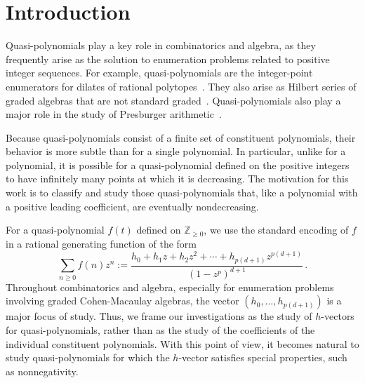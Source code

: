 \documentclass[12pt]{amsart}
\theoremstyle{definition}
\numberwithin{equation}{section}
\renewcommand\>{\rangle}
\newcommand\<{\langle}
\newcommand\0{\mathbf{0}}
\newcommand\ZZ{\mathbb{Z}}
\begin{document}


\section{Introduction}%
\label{sec:intro}%

Quasi-polynomials play a key role in combinatorics and algebra, as they frequently arise as the solution to enumeration problems related to positive integer sequences.
For example, quasi-polynomials are the integer-point enumerators for dilates of rational polytopes~\cite{ccd}.
They also arise as Hilbert series of graded algebras that are not standard graded~\cite{brunsherzog,numerical}.
Quasi-polynomials also play a major role in the study of Presburger arithmetic~\cite{presburgerarith,woodsunreasonable}.

Because quasi-polynomials consist of a finite set of constituent polynomials, their behavior is more subtle than for a single polynomial.
In particular, unlike for a polynomial, it is possible for a quasi-polynomial defined on the positive integers to have infinitely many points at which it is decreasing.	
The motivation for this work is to classify and study those quasi-polynomials that, like a polynomial with a positive leading coefficient, are eventually nondecreasing.

For a quasi-polynomial $f(t)$ defined on $\ZZ_{\geq 0}$, we use the standard encoding of $f$ in a rational generating function of the form
\[
\sum_{n \ge 0} f(n) z^n
:= \frac{h_0 + h_1z + h_2z^2 + \cdots +h_{p(d+1)}z^{p(d+1)}}{(1-z^p)^{d+1}}\, .
\]
Throughout combinatorics and algebra, especially for enumeration problems involving graded Cohen-Macaulay algebras, the vector $(h_0,\ldots,h_{p(d+1)})$ is a major focus of study.
Thus, we frame our investigations as the study of $h$-vectors for quasi-polynomials, rather than as the study of the coefficients of the individual constituent polynomials.
With this point of view, it becomes natural to study quasi-polynomials for which the $h$-vector satisfies special properties, such as nonnegativity.
\end{document}
